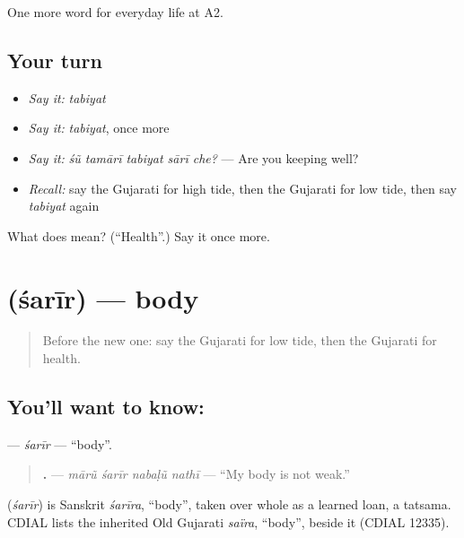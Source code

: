\begin{grammarlens}[title={What you've built}]
One more word for everyday life at A2.
\end{grammarlens}

\subsection*{Your turn}
\begin{itemize}
\raggedright
  \item \emph{Say it:} \emph{tabiyat}
  \item \emph{Say it:} \emph{tabiyat}, once more
  \item \emph{Say it:} \emph{śũ tamārī tabiyat sārī che?} — Are you keeping well?
  \item \emph{Recall:} say the Gujarati for high tide, then the Gujarati for low tide, then say \emph{tabiyat} again
\end{itemize}

\begin{tcolorbox}[breakable,colback=teal!4,colframe=teal!35!black,title={Before you move on}]
What does  mean? (\textquotedblleft{}Health\textquotedblright{}.) Say it once more.
\end{tcolorbox}
\section[\texorpdfstring{\gu{શરીર} (śarīr)}{શરીર (śarīr)}]{ (śarīr) — body}

\label{lesson:GU-C223-sharir}



\begin{quote}
Before the new one: say the Gujarati for low tide, then the Gujarati for health.
\end{quote}

\subsection*{You'll want to know: }
\textbf{} — \emph{śarīr} — \textquotedblleft{}body\textquotedblright{}.

\begin{quote}
\textbf{   .} — \emph{mārũ śarīr nabaḷũ nathī} — \textquotedblleft{}My body is not weak.\textquotedblright{}
\end{quote}

\begin{cousinweb}
\textbf{} (\emph{śarīr}) is Sanskrit \emph{śarīra}, \textquotedblleft{}body\textquotedblright{}, taken over whole as a learned loan, a tatsama. CDIAL lists the inherited Old Gujarati \emph{saïra}, \textquotedblleft{}body\textquotedblright{}, beside it (CDIAL 12335).
\end{cousinweb}

